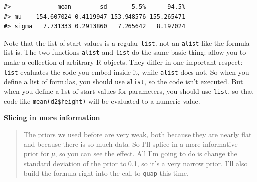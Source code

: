 \documentclass[
  letterpaper,
  DIV=11,
  numbers=noendperiod]{scrreprt}
\begin{document}
\begin{verbatim}
#>             mean        sd       5.5%      94.5%
#> mu    154.607024 0.4119947 153.948576 155.265471
#> sigma   7.731333 0.2913860   7.265642   8.197024
\end{verbatim}

\begin{tcolorbox}[enhanced jigsaw, colframe=quarto-callout-note-color-frame, colback=white, toprule=.15mm, breakable, arc=.35mm, bottomtitle=1mm, colbacktitle=quarto-callout-note-color!10!white, toptitle=1mm, titlerule=0mm, title=\textcolor{quarto-callout-note-color}{\faInfo}\hspace{0.5em}{list() and alist()}, leftrule=.75mm, opacityback=0, rightrule=.15mm, opacitybacktitle=0.6, bottomrule=.15mm, left=2mm, coltitle=black]

Note that the list of start values is a regular \texttt{list}, not an
\texttt{alist} like the formula list is. The two functions
\texttt{alist} and \texttt{list} do the same basic thing: allow you to
make a collection of arbitrary R objects. They differ in one important
respect: \texttt{list} evaluates the code you embed inside it, while
\texttt{alist} does not. So when you define a list of formulas, you
should use \texttt{alist}, so the code isn't executed. But when you
define a list of start values for parameters, you should use
\texttt{list}, so that code like \texttt{mean(d2\$height)} will be
evaluated to a numeric value.

\end{tcolorbox}

\textbf{Slicing in more information}

\begin{quote}
The priors we used before are very weak, both because they are nearly
flat and because there is so much data. So I'll splice in a more
informative prior for \emph{μ}, so you can see the effect. All I'm going
to do is change the standard deviation of the prior to 0.1, so it's a
very narrow prior. I'll also build the formula right into the call to
\texttt{quap} this time.
\end{quote}
\end{document}
